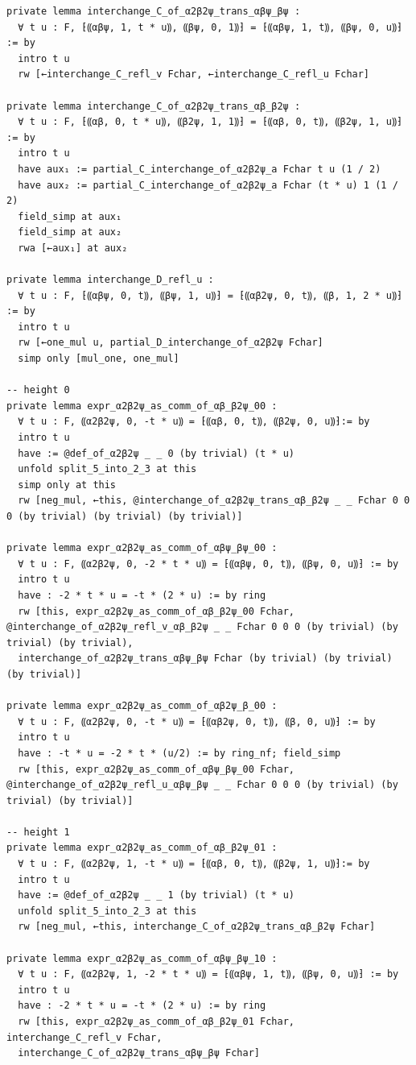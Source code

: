 \documentclass[10pt,a4paper]{article}
\begin{document}
\begin{Verbatim}
private lemma interchange_C_of_α2β2ψ_trans_αβψ_βψ :
  ∀ t u : F, ⁅⸨αβψ, 1, t * u⸩, ⸨βψ, 0, 1⸩⁆ = ⁅⸨αβψ, 1, t⸩, ⸨βψ, 0, u⸩⁆ := by
  intro t u
  rw [←interchange_C_refl_v Fchar, ←interchange_C_refl_u Fchar]

private lemma interchange_C_of_α2β2ψ_trans_αβ_β2ψ :
  ∀ t u : F, ⁅⸨αβ, 0, t * u⸩, ⸨β2ψ, 1, 1⸩⁆ = ⁅⸨αβ, 0, t⸩, ⸨β2ψ, 1, u⸩⁆ := by
  intro t u
  have aux₁ := partial_C_interchange_of_α2β2ψ_a Fchar t u (1 / 2)
  have aux₂ := partial_C_interchange_of_α2β2ψ_a Fchar (t * u) 1 (1 / 2)
  field_simp at aux₁
  field_simp at aux₂
  rwa [←aux₁] at aux₂

private lemma interchange_D_refl_u :
  ∀ t u : F, ⁅⸨αβψ, 0, t⸩, ⸨βψ, 1, u⸩⁆ = ⁅⸨αβ2ψ, 0, t⸩, ⸨β, 1, 2 * u⸩⁆ := by
  intro t u
  rw [←one_mul u, partial_D_interchange_of_α2β2ψ Fchar]
  simp only [mul_one, one_mul]

-- height 0
private lemma expr_α2β2ψ_as_comm_of_αβ_β2ψ_00 :
  ∀ t u : F, ⸨α2β2ψ, 0, -t * u⸩ = ⁅⸨αβ, 0, t⸩, ⸨β2ψ, 0, u⸩⁆:= by
  intro t u
  have := @def_of_α2β2ψ _ _ 0 (by trivial) (t * u)
  unfold split_5_into_2_3 at this
  simp only at this
  rw [neg_mul, ←this, @interchange_of_α2β2ψ_trans_αβ_β2ψ _ _ Fchar 0 0 0 (by trivial) (by trivial) (by trivial)]

private lemma expr_α2β2ψ_as_comm_of_αβψ_βψ_00 :
  ∀ t u : F, ⸨α2β2ψ, 0, -2 * t * u⸩ = ⁅⸨αβψ, 0, t⸩, ⸨βψ, 0, u⸩⁆ := by
  intro t u
  have : -2 * t * u = -t * (2 * u) := by ring
  rw [this, expr_α2β2ψ_as_comm_of_αβ_β2ψ_00 Fchar, @interchange_of_α2β2ψ_refl_v_αβ_β2ψ _ _ Fchar 0 0 0 (by trivial) (by trivial) (by trivial),
  interchange_of_α2β2ψ_trans_αβψ_βψ Fchar (by trivial) (by trivial) (by trivial)]

private lemma expr_α2β2ψ_as_comm_of_αβ2ψ_β_00 :
  ∀ t u : F, ⸨α2β2ψ, 0, -t * u⸩ = ⁅⸨αβ2ψ, 0, t⸩, ⸨β, 0, u⸩⁆ := by
  intro t u
  have : -t * u = -2 * t * (u/2) := by ring_nf; field_simp
  rw [this, expr_α2β2ψ_as_comm_of_αβψ_βψ_00 Fchar, @interchange_of_α2β2ψ_refl_u_αβψ_βψ _ _ Fchar 0 0 0 (by trivial) (by trivial) (by trivial)]

-- height 1
private lemma expr_α2β2ψ_as_comm_of_αβ_β2ψ_01 :
  ∀ t u : F, ⸨α2β2ψ, 1, -t * u⸩ = ⁅⸨αβ, 0, t⸩, ⸨β2ψ, 1, u⸩⁆:= by
  intro t u
  have := @def_of_α2β2ψ _ _ 1 (by trivial) (t * u)
  unfold split_5_into_2_3 at this
  rw [neg_mul, ←this, interchange_C_of_α2β2ψ_trans_αβ_β2ψ Fchar]

private lemma expr_α2β2ψ_as_comm_of_αβψ_βψ_10 :
  ∀ t u : F, ⸨α2β2ψ, 1, -2 * t * u⸩ = ⁅⸨αβψ, 1, t⸩, ⸨βψ, 0, u⸩⁆ := by
  intro t u
  have : -2 * t * u = -t * (2 * u) := by ring
  rw [this, expr_α2β2ψ_as_comm_of_αβ_β2ψ_01 Fchar, interchange_C_refl_v Fchar,
  interchange_C_of_α2β2ψ_trans_αβψ_βψ Fchar]


\end{Verbatim}
\end{document}

